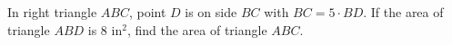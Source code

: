 In right triangle $ABC$, point $D$ is on side $BC$ with $BC=5\cdot BD$. If the area of triangle $ABD$ is $8$ in$^2$, find the area of triangle $ABC$.
